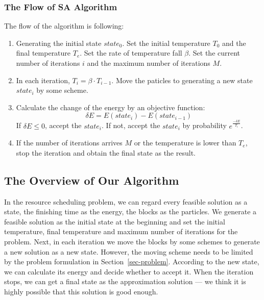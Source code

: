 \documentclass{llncs}
\begin{document}
	\subsubsection{The Flow of SA Algorithm}
	The flow of the algorithm is following: \\
	\begin{enumerate}
		\item Generating the initial state $state_0$. Set the initial temperature $T_0$ and the final temperature $T_e$. Set the rate of temperature fall $\beta$. Set the current number of iterations $i$ and the maximum number of iterations $M$.
		\item In each iteration, $T_i = \beta \cdot T_{i-1}$. Move the paticles to generating a new state $state_i$ by some scheme. 
		\item Calculate the change of the energy by an objective function:
		\[
		\delta E = E(state_i) - E(state_{i-1})
		\] 
		If $\delta E \leq 0$, accept the $state_i$. If not, accept the $state_i$ by probability $e^\frac{-\delta E}{T_i}$.
		\item If the number of iterations arrives $M$ or the temperature is lower than $T_e$, stop the iteration and obtain the final state as the result.
	\end{enumerate}
	
	\subsection{The Overview of Our Algorithm} \label{susec-overview}
	In the resource scheduling problem, we can regard every feasible solution as a state, the finishing time as the energy, the blocks as the particles. We generate a feasible solution as the initial state at the beginning and set the initial temperature, final temperature and maximum number of iterations for the problem. Next, in each iteration we move the blocks by some schemes to generate a new solution as a new state. However, the moving scheme needs to be limited by the problem formulation in Section~\ref{sec-problem}. According to the new state, we can calculate its energy and decide whether to accept it. When the iteration stops, we can get a final state as the approximation solution --- we think it is highly possible that this solution is good enough.
	
\end{document}
